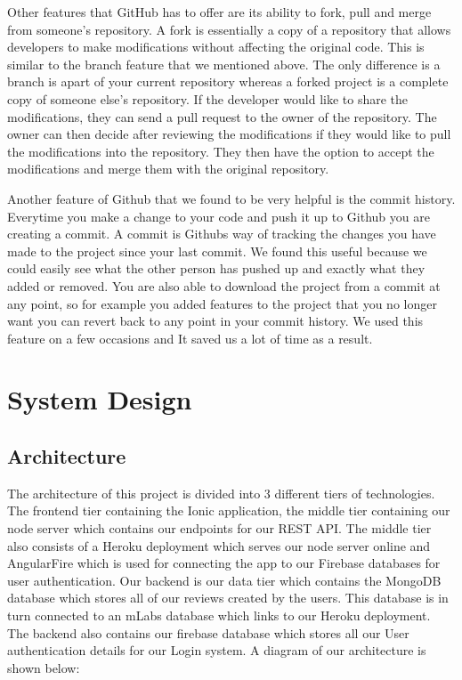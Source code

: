 Other features that GitHub has to offer are its ability to fork, pull and merge from someone's repository. A fork is essentially a copy of a repository that allows developers to make modifications without affecting the original code. This is similar to the branch feature that we mentioned above. The only difference is a branch is apart of your current repository whereas a forked project is a complete copy of someone else's repository.  If the developer would like to share the modifications, they can send a pull request to the owner of the repository. The owner can then decide after reviewing the modifications if they would like to pull the modifications into the repository. They then have the option to accept the modifications and merge them with the original repository.\cite{githubop}

Another feature of Github that we found to be very helpful is the commit history. Everytime you make a change to your code and push it up to Github you are creating a commit. A commit is Githubs way of tracking the changes you have made to the project since your last commit. We found this useful because we could easily see what the other person has pushed up and exactly what they added or removed. You are also able to download the project from a commit at any point, so for example you added features to the project that you no longer want you can revert back to any point in your commit history. We used this feature on a few occasions and It saved us a lot of time as a result.

\chapter{System Design}
 \section{Architecture}

The architecture of this project is divided into 3 different tiers of technologies. The frontend tier containing the Ionic application, the middle tier containing our node server which contains our endpoints for our REST API. The middle tier also consists of a Heroku deployment which serves our node server online and AngularFire which is used for connecting the app to our Firebase databases for user authentication. Our backend is our data tier which contains the MongoDB database which stores all of our reviews created by the users. This database is in turn connected to an mLabs database which links to our Heroku deployment. The backend also contains our firebase database which stores all our User authentication details for our Login system. A diagram of our architecture is shown below:


